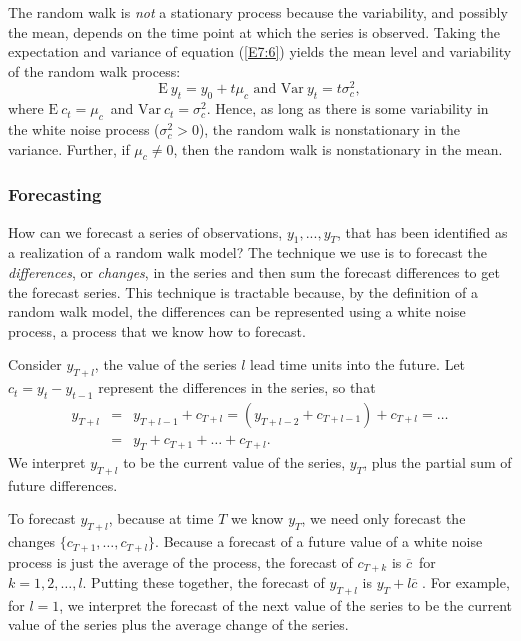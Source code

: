
The random walk is \emph{not} a stationary process because the
variability, and possibly the mean, depends on the time point at
which the series is observed. Taking the expectation and variance of
equation (\ref{E7:6}) yields the mean level and variability of the
random walk process:
\begin{equation*}
\mathrm{E~}y_t = y_0 + t\mu_c\text{ \ \ and \ \ }\mathrm{Var~} y_t =
t \sigma_c^2,
\end{equation*}
where $\mathrm{E~}c_t = \mu_c$\ and $\mathrm{Var~}c_t = \sigma
_c^2$. Hence, as long as there is some variability in the white
noise process ($\sigma_c^2 > 0$), the random walk is nonstationary
in the variance. Further, if $\mu_c\neq 0$, then the random walk is
nonstationary in the mean.


\subsubsection*{Forecasting}

How can we forecast a series of observations, $y_1,...,y_T$, that
has been identified as a realization of a random walk model? The
technique we use is to forecast the \emph{differences}, or
\emph{changes}, in the series and then sum the forecast differences
to get the forecast series. This technique is tractable because, by
the definition of a random walk model, the differences can be
represented using a white noise process, a process that we know how
to forecast.

Consider $y_{T+l}$, the value of the series $l$ lead time units into
the future. Let $c_t=y_t-y_{t-1}$ represent the differences in the
series, so that
\begin{eqnarray*}
y_{T+l} &=&y_{T+l-1}+c_{T+l} = \left( y_{T+l-2} + c_{T+l-1}\right)
+c_{T+l} = \ldots
\\
&=&y_T+c_{T+1}+ \ldots +c_{T+l}.
\end{eqnarray*}%
We interpret $y_{T+l}$ to be the current value of the series, $y_T$,
plus the partial sum of future differences.

To forecast $y_{T+l}$, because at time $T$ we know $y_T$, we need
only forecast the changes $\{c_{T+1}, \ldots, c_{T+l}\}$. Because a
forecast of a future value of a white noise process is just the
average of the process, the forecast of $c_{T+k}$ is $\overline{c}$\
for $k=1,2,\ldots,l$. Putting these together, the forecast of
$y_{T+l}$ is $y_T+l\overline{c}$ . For example, for $l=1$, we
interpret the forecast of the next value of the series to be the
current value of the series plus the average change of the series.

